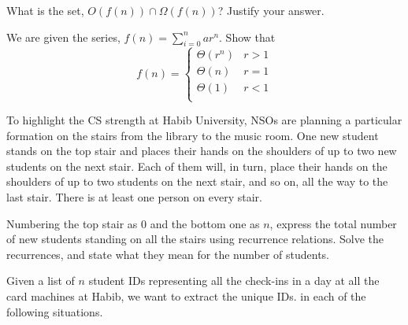 \documentclass[addpoints]{exam}
\begin{document}
\begin{questions}
  \begin{solution}
    \begin{parts}
      \part 
      \part 
    \end{parts}
  \end{solution}
  
  \question[5] What is the set, $O(f(n)) \cap \Omega(f(n))$? Justify your answer.
  
  \begin{solution}
  \end{solution}
  
  \question[5] We are given the series, $f(n) = \sum_{i=0}^nar^n$. Show that
  \[
    f(n) =
    \begin{cases}
      \Theta(r^n) & r > 1\\
      \Theta(n) & r = 1\\
      \Theta(1) & r < 1\\
    \end{cases}
  \]
  
  \begin{solution}
  \end{solution}

  \question[5] To highlight the CS strength at Habib University, NSOs are planning a particular formation on the stairs from the library to the music room. One new student stands on the top stair and places their hands on the shoulders of up to two new students on the next stair. Each of them will, in turn, place their hands on the shoulders of up to two students on the next stair, and so on, all the way to the last stair. There is at least one person on every stair.

  Numbering the top stair as $0$ and the bottom one as $n$, express the total number of new students standing on all the stairs using recurrence relations. Solve the recurrences, and state what they mean for the number of students.
  
  \begin{solution}
  \end{solution}
  
  \question Given a list of $n$ student IDs representing all the check-ins in a day at all the card machines at Habib, we want to extract the unique IDs. in each of the following situations. 
  \begin{parts}

\end{parts}
\end{questions}
\end{document}
